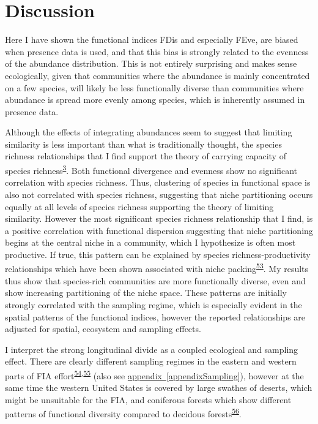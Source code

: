 \documentclass[
  10pt,
]{article}
\newcommand{\aref}[1]{\hyperref[#1]{appendix~\ref*{#1}}}
\begin{document}
\hypertarget{discussion}{%
\section{Discussion}\label{discussion}}

Here I have shown the functional indices FDis and especially FEve, are biased when presence data is used, and that this bias is strongly related to the evenness of the abundance distribution. This is not entirely surprising and makes sense ecologically, given that communities where the abundance is mainly concentrated on a few species, will likely be less functionally diverse than communities where abundance is spread more evenly among species, which is inherently assumed in presence data.

Although the effects of integrating abundances seem to suggest that limiting similarity is less important than what is traditionally thought, the species richness relationships that I find support the theory of carrying capacity of species richness\textsuperscript{\protect\hyperlink{ref-Storch2019}{3}}. Both functional divergence and evenness show no significant correlation with species richness. Thus, clustering of species in functional space is also not correlated with species richness, suggesting that niche partitioning occurs equally at all levels of species richness supporting the theory of limiting similarity. However the most significant species richness relationship that I find, is a positive correlation with functional dispersion suggesting that niche partitioning begins at the central niche in a community, which I hypothesize is often most productive. If true, this pattern can be explained by species richness-productivity relationships which have been shown associated with niche packing\textsuperscript{\protect\hyperlink{ref-Pellissier2018}{53}}. My results thus show that species-rich communities are more functionally diverse, even and show increasing partitioning of the niche space. These patterns are initially strongly correlated with the sampling regime, which is especially evident in the spatial patterns of the functional indices, however the reported relationships are adjusted for spatial, ecosystem and sampling effects.

I interpret the strong longitudinal divide as a coupled ecological and sampling effect. There are clearly different sampling regimes in the eastern and western parts of FIA effort\textsuperscript{\protect\hyperlink{ref-Mcroberts2005}{54},\protect\hyperlink{ref-Wiener2021}{55}} (also see \aref{appendixSampling}), however at the same time the western United States is covered by large swathes of deserts, which might be unsuitable for the FIA, and coniferous forests which show different patterns of functional diversity compared to decidous forests\textsuperscript{\protect\hyperlink{ref-Lubek2020}{56}}.
\end{document}
